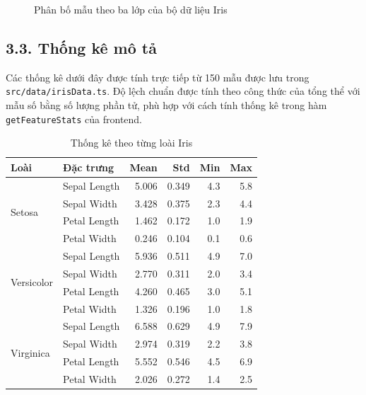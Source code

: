 \documentclass{article}
\begin{document}
	\begin{figure}[H]
		\centering
		\caption{Phân bố mẫu theo ba lớp của bộ dữ liệu Iris}
		\label{fig:classdistribution}
	\end{figure}
	
	\subsection{3.3. Thống kê mô tả}
	\hspace{0.5cm}
	Các thống kê dưới đây được tính trực tiếp từ 150 mẫu được lưu trong \texttt{src/data/irisData.ts}. Độ lệch chuẩn được tính theo công thức của tổng thể với mẫu số bằng số lượng phần tử, phù hợp với cách tính thống kê trong hàm \texttt{getFeatureStats} của frontend.
	
	\begin{table}[H]
		\centering
		\caption{Thống kê theo từng loài Iris}
		\label{tab:classstats}
		\small
		\begin{tabular}{llrrrr}
			\toprule
			\textbf{Loài} & \textbf{Đặc trưng} & \textbf{Mean} & \textbf{Std} & \textbf{Min} & \textbf{Max}\\
			\midrule
			\multirow{4}{*}{Setosa}
			& Sepal Length & 5.006 & 0.349 & 4.3 & 5.8\\
			& Sepal Width  & 3.428 & 0.375 & 2.3 & 4.4\\
			& Petal Length & 1.462 & 0.172 & 1.0 & 1.9\\
			& Petal Width  & 0.246 & 0.104 & 0.1 & 0.6\\
			\midrule
			\multirow{4}{*}{Versicolor}
			& Sepal Length & 5.936 & 0.511 & 4.9 & 7.0\\
			& Sepal Width  & 2.770 & 0.311 & 2.0 & 3.4\\
			& Petal Length & 4.260 & 0.465 & 3.0 & 5.1\\
			& Petal Width  & 1.326 & 0.196 & 1.0 & 1.8\\
			\midrule
			\multirow{4}{*}{Virginica}
			& Sepal Length & 6.588 & 0.629 & 4.9 & 7.9\\
			& Sepal Width  & 2.974 & 0.319 & 2.2 & 3.8\\
			& Petal Length & 5.552 & 0.546 & 4.5 & 6.9\\
			& Petal Width  & 2.026 & 0.272 & 1.4 & 2.5\\
			\bottomrule
		\end{tabular}
	\end{table}
	
\end{document}
